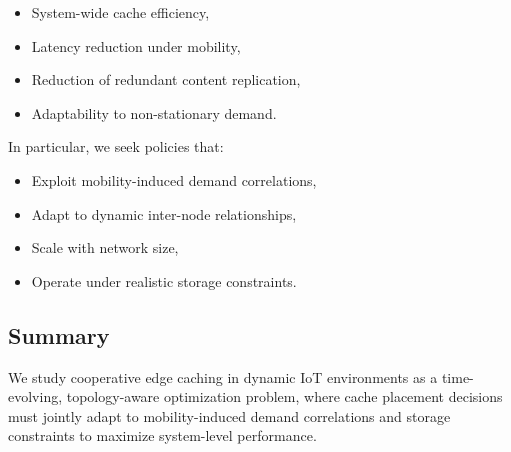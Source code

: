 \begin{itemize}
    \item System-wide cache efficiency,
    \item Latency reduction under mobility,
    \item Reduction of redundant content replication,
    \item Adaptability to non-stationary demand.
\end{itemize}

In particular, we seek policies that:

\begin{itemize}
    \item Exploit mobility-induced demand correlations,
    \item Adapt to dynamic inter-node relationships,
    \item Scale with network size,
    \item Operate under realistic storage constraints.
\end{itemize}

\subsection{Summary}

We study cooperative edge caching in dynamic IoT environments as a time-evolving, topology-aware optimization problem, where cache placement decisions must jointly adapt to mobility-induced demand correlations and storage constraints to maximize system-level performance.
